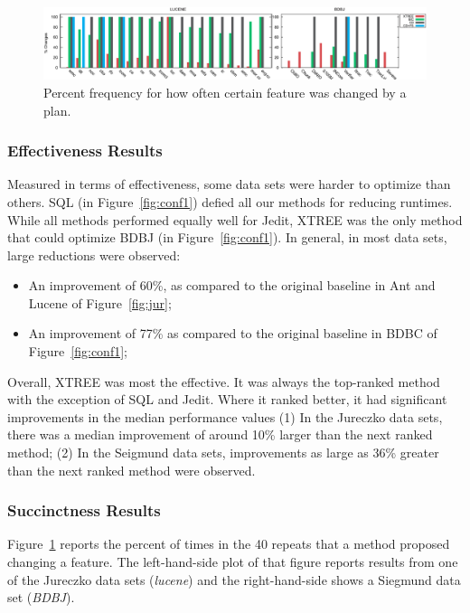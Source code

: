 \documentclass{sig-alternate}
\newcommand{\bi}{\begin{itemize}}
\newcommand{\ei}{\end{itemize}}
\newcommand{\fig}[1]{Figure~\ref{fig:#1}}
\begin{document}
\begin{figure}[!t]
\centering
\includegraphics[width=\linewidth]{figs/Deltas-both.eps}
\caption{Percent frequency for how often certain feature was changed by a plan.}\label{fig:changed}
\end{figure}

\subsubsection{Effectiveness Results}


Measured in terms of effectiveness,
some data sets were harder to optimize than others.  SQL (in \fig{conf1}) defied all 
our methods for reducing runtimes. While all methods performed equally well for Jedit, XTREE was the only method that could optimize BDBJ (in \fig{conf1}). In general, in most data sets,
large reductions were observed:
\bi
\item
An improvement of 60\%, as compared to the original baseline in Ant and Lucene of \fig{jur};
\item
An improvement of 77\% as compared to the original baseline in BDBC  of \fig{conf1};
\ei

Overall, XTREE was most the effective. It was always the top-ranked method with 
the exception of SQL and Jedit. Where it ranked better, it had significant improvements in the median performance values (1) In the Jureczko data sets, there was a median improvement of around 10\% larger than the next ranked method; (2) In the Seigmund data sets, improvements as large as 36\% greater than the next ranked method were observed.



\subsubsection{Succinctness Results}



\fig{changed} reports the percent of times in the 40 repeats that a method proposed changing a feature.
The left-hand-side plot of that figure reports results from one of the  Jureczko data sets ({\em lucene}) and the right-hand-side
  shows a Siegmund data set ({\em BDBJ}). 
  
\end{document}
